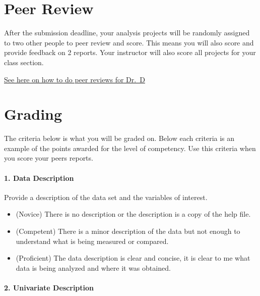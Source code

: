 \documentclass[
  letterpaper,
  DIV=11,
  numbers=noendperiod,
  oneside]{scrreprt}
\providecommand{\tightlist}{%
  \setlength{\itemsep}{0pt}\setlength{\parskip}{0pt}}\usepackage{longtable,booktabs,array}
\begin{document}
\chapter*{Peer Review}\label{peer-review}


After the submission deadline, your analysis projects will be randomly
assigned to two other people to peer review and score. This means you
will also score and provide feedback on 2 reports. Your instructor will
also score all projects for your class section.

\href{https://math130.netlify.app/pr_rad.qmd}{See here on how to do peer
reviews for Dr.~D}

\chapter*{Grading}\label{grading}


The criteria below is what you will be graded on. Below each criteria is
an example of the points awarded for the level of competency. Use this
criteria when you score your peers reports.

\subsubsection*{1. Data Description}\label{data-description}

Provide a description of the data set and the variables of interest.

\begin{itemize}
\tightlist
\item
  (Novice) There is no description or the description is a copy of the
  help file.
\item
  (Competent) There is a minor description of the data but not enough to
  understand what is being measured or compared.
\item
  (Proficient) The data description is clear and concise, it is clear to
  me what data is being analyzed and where it was obtained.
\end{itemize}

\subsubsection*{2. Univariate Description}\label{univariate-description}
\end{document}
